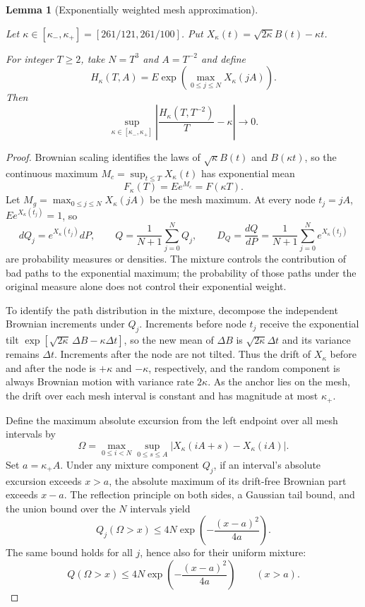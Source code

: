 \documentclass[a4paper,11pt]{article}
\newtheorem{lemma}{Lemma}[section]
\theoremstyle{remark}
\begin{document}
\begin{lemma}[Exponentially weighted mesh approximation]\label{lem:papermesh}\leavevmode\par
Let $\kappa\in[\kappa_-,\kappa_+]=[261/121,261/100]$. Put
$X_\kappa(t)=\sqrt{2\kappa}B(t)-\kappa t$.

For integer $T\ge2$, take
$N=T^3$ and $A=T^{-2}$ and define
\[
 H_\kappa(T,A)=E\exp\!\left(\max_{0\le j\le N}X_\kappa(jA)\right).
\]
Then
\[
 \sup_{\kappa\in[\kappa_-,\kappa_+]}
 \left|\frac{H_\kappa(T,T^{-2})}{T}-\kappa\right|\longrightarrow0.
\]
\end{lemma}
\begin{proof}
Brownian scaling identifies the laws of $\sqrt{\kappa}B(t)$ and $B(\kappa t)$, so the continuous maximum
$M_c=\sup_{t\le T}X_\kappa(t)$ has exponential mean
\[
 F_\kappa(T)=Ee^{M_c}=F(\kappa T).
\]
Let $M_g=\max_{0\le j\le N}X_\kappa(jA)$ be the mesh maximum.
At every node $t_j=jA$, $Ee^{X_\kappa(t_j)}=1$, so
\[
 dQ_j=e^{X_\kappa(t_j)}dP,
 \qquad Q=\frac1{N+1}\sum_{j=0}^NQ_j,
 \qquad D_Q=\frac{dQ}{dP}
 =\frac1{N+1}\sum_{j=0}^Ne^{X_\kappa(t_j)}
\]
are probability measures or densities. The mixture controls the contribution of bad paths to the exponential maximum;
the probability of those paths under the original measure alone does not control their exponential weight.

To identify the path distribution in the mixture, decompose the independent Brownian increments under $Q_j$.
Increments before node $t_j$ receive the exponential tilt
\(\exp[\sqrt{2\kappa}\,\Delta B-\kappa\Delta t]\),
so the new mean of $\Delta B$ is $\sqrt{2\kappa}\Delta t$ and its variance remains
$\Delta t$. Increments after the node are not tilted. Thus the drift of $X_\kappa$ before and after the node
is $+\kappa$ and $-\kappa$, respectively, and the random component is always Brownian motion with variance rate
$2\kappa$. As the anchor lies on the mesh, the drift over each mesh interval is constant
and has magnitude at most $\kappa_+$.

Define the maximum absolute excursion from the left endpoint over all mesh intervals by
\[
 \Omega=\max_{0\le i<N}\sup_{0\le s\le A}
 |X_\kappa(iA+s)-X_\kappa(iA)|.
\]
Set $a=\kappa_+A$. Under any mixture component $Q_j$, if an interval's absolute excursion
exceeds $x>a$, the absolute maximum of its drift-free Brownian part exceeds $x-a$.
The reflection principle on both sides, a Gaussian tail bound, and the union bound over the $N$ intervals yield
\[
 Q_j(\Omega>x)\le4N\exp\!\left(-\frac{(x-a)^2}{4a}\right).
\]
The same bound holds for all $j$, hence also for their uniform mixture:
\begin{equation}\label{eq:paperomegatail}
 Q(\Omega>x)\le4N\exp\!\left(-\frac{(x-a)^2}{4a}\right)
 \qquad(x>a).
\end{equation}


\end{proof}
\end{document}

